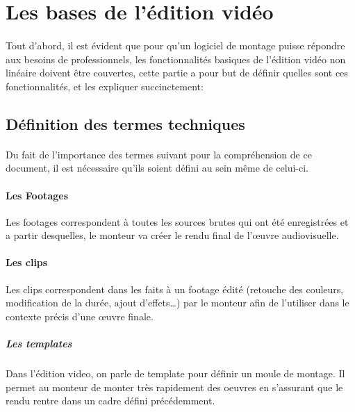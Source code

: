 \newpage

\section{Les bases de l'édition vidéo}

\paragraph{}

Tout d'abord, il est évident que pour qu'un logiciel de montage
puisse répondre aux besoins de professionnels, les fonctionnalités
basiques de l'édition vidéo non linéaire doivent être couvertes,
cette partie a pour but de définir quelles sont ces fonctionnalités,
et les expliquer succinctement:

\subsection{Définition des termes techniques}

\paragraph {}

Du fait de l'importance des termes suivant pour la compréhension de
ce document, il est nécessaire qu'ils soient défini au sein même
de celui-ci.

\paragraph{Les Footages}

Les footages correspondent à toutes les sources brutes qui ont été
enregistrées et a partir desquelles, le monteur va créer le rendu
final de l'œuvre audiovisuelle.

\paragraph{Les clips}

Les clips correspondent dans les faits à un footage édité (retouche
des couleurs, modification de la durée, ajout d'effets\ldots) par le
monteur afin de l'utiliser dans le contexte précis d'une œuvre finale.

\subparagraph{Les templates}

Dans l'édition video, on parle de template pour définir un moule de
montage.  Il permet au monteur de monter très rapidement des oeuvres
en s'assurant que le rendu rentre dans un cadre défini précédemment.

